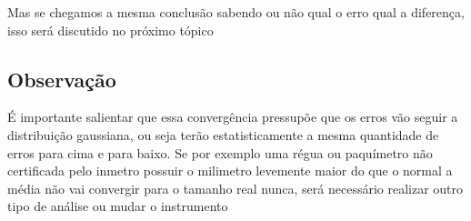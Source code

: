 \documentclass{article}
\begin{document}
    Mas se chegamos a mesma conclusão sabendo ou não qual o erro qual a diferença, isso será discutido no próximo tópico
    
    \subsection{Observação}
    
    É importante salientar que essa convergência pressupõe que os erros vão seguir a distribuição gaussiana, ou seja terão estatisticamente a mesma quantidade de erros para cima e para baixo. Se por exemplo uma régua ou paquímetro não certificada pelo inmetro possuir o milimetro levemente maior do que o normal a média não vai convergir para o tamanho real nunca, será necessário realizar outro tipo de análise ou mudar o instrumento
    
\end{document}

